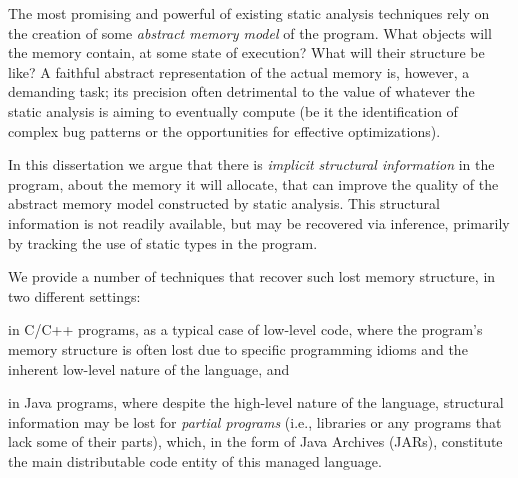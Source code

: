 The most promising and powerful of existing static analysis techniques
rely on the creation of some \emph{abstract memory model} of the
program. What objects will the memory contain, at some state of
execution? What will their structure be like?  A faithful abstract
representation of the actual memory is, however, a demanding task; its
precision often detrimental to the value of whatever the static
analysis is aiming to eventually compute (be it the identification of
complex bug patterns or the opportunities for effective
optimizations).

In this dissertation we argue that there is \emph{implicit structural
  information} in the program, about the memory it will allocate, that
can improve the quality of the abstract memory model constructed by
static analysis. This structural information is not readily available,
but may be recovered via inference, primarily by tracking the use of
static types in the program.

We provide a number of techniques that recover such
lost memory structure, in two different settings:%
\begin{inparaenum}[(1)]
\item in C/C++ programs, as a typical case of low-level code, where
  the program's memory structure is often lost due to specific
  programming idioms and the inherent low-level nature of the
  language, and
\item in Java programs, where despite the high-level nature of the
  language, structural information may be lost for \emph{partial
    programs} (i.e., libraries or any programs that lack some of their
  parts), which, in the form of Java Archives (JARs), constitute the
  main distributable code entity of this managed language.
\end{inparaenum}


